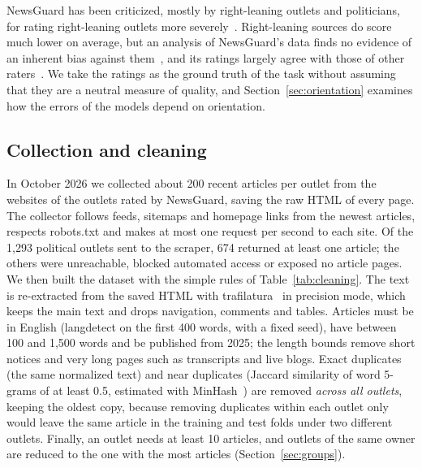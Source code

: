 \documentclass[11pt,a4paper]{article}
\begin{document}
NewsGuard has been criticized, mostly by right-leaning outlets and politicians, for rating right-leaning outlets more
severely~\cite{oremus2024newsguard}. Right-leaning sources do score much lower on average, but an analysis of
NewsGuard's data finds no evidence of an inherent bias against them~\cite{luhring2025best}, and its ratings largely agree
with those of other raters~\cite{lin2023high}. We take the ratings as the ground truth of the task without assuming that
they are a neutral measure of quality, and Section~\ref{sec:orientation} examines how the errors of the models depend on
orientation.

\subsection{Collection and cleaning}\label{sec:cleaning}
In October 2026 we collected about 200 recent articles per outlet from the websites of the outlets rated by NewsGuard,
saving the raw HTML of every page. The collector follows feeds, sitemaps and homepage links from the newest articles,
respects robots.txt and makes at most one request per second to each site. Of the 1,293 political outlets sent to the
scraper, 674 returned at least one article; the others were unreachable, blocked automated access or exposed no article
pages. We then built the dataset with the simple rules of Table~\ref{tab:cleaning}. The text is re-extracted from the
saved HTML with trafilatura~\cite{barbaresi2021trafilatura} in precision mode, which keeps the main text and drops
navigation, comments and tables. Articles must be in English (langdetect on the first 400 words, with a fixed seed),
have between 100 and 1,500 words and be published from 2025; the length bounds remove short notices and very long pages
such as transcripts and live blogs. Exact duplicates (the same normalized text) and near duplicates (Jaccard similarity
of word 5-grams of at least 0.5, estimated with MinHash~\cite{broder1997resemblance}) are removed \emph{across all
outlets}, keeping the oldest copy, because removing duplicates within each outlet only would leave the same article in
the training and test folds under two different outlets. Finally, an outlet needs at least 10 articles, and outlets of
the same owner are reduced to the one with the most articles (Section~\ref{sec:groups}).
\end{document}
